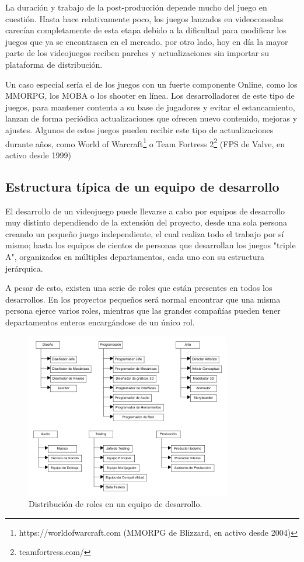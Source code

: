La duración y trabajo de la post-producción depende mucho del juego en cuestión. Hasta hace relativamente poco, los juegos lanzados en videoconsolas carecían completamente de esta etapa debido a la dificultad para modificar los juegos que ya se encontrasen en el mercado. por otro lado, hoy en día la mayor parte de los videojuegos reciben parches y actualizaciones sin importar su plataforma de distribución\cite{development_and_production}.

Un caso especial sería el de los juegos con un fuerte componente Online, como los MMORPG, los MOBA o los shooter en línea. Los desarrolladores de este tipo de juegos, para mantener contenta a su base de jugadores y evitar el estancamiento, lanzan de forma periódica actualizaciones que ofrecen nuevo contenido, mejoras y ajustes. Algunos de estos juegos pueden recibir este tipo de actualizaciones durante años, como World of Warcraft\footnote{https://worldofwarcraft.com (MMORPG de Blizzard, en activo desde 2004)} o Team Fortress 2\footnote{teamfortress.com/} (FPS de Valve, en activo desde 1999)

\subsection{Estructura típica de un equipo de desarrollo}
El desarrollo de un videojuego puede llevarse a cabo por equipos de desarrollo muy distinto dependiendo de la extensión del proyecto, desde una sola persona creando un pequeño juego independiente, el cual realiza todo el trabajo por sí mismo; hasta los equipos de cientos de personas que desarrollan los juegos "triple A", organizados en múltiples departamentos, cada uno con su estructura jerárquica.

A pesar de esto, existen una serie de roles que están presentes en todos los desarrollos. En los proyectos pequeños será normal encontrar que una misma persona ejerce varios roles, mientras que las grandes compañías pueden tener departamentos enteros encargándose de un único rol.

\begin{figure}[h]
    \centering
    \includegraphics[width=0.8\textwidth]{images/estadodelarte/desarrollo/table-roles}
    \caption{Distribución de roles en un equipo de desarrollo.}
\end{figure}

